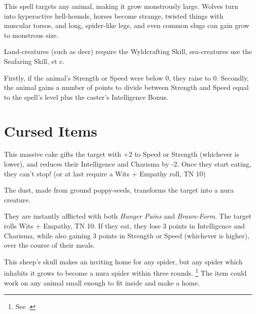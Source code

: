 \begin{multicols}{2}
This spell targets any animal, making it grow monstrously large.
Wolves turn into hyperactive hell-hounds, horses become strange, twisted things with muscular torsos, and long, spider-like legs, and even common slugs can gain grow to monstrous size.

Land-creatures (such as deer) require the Wyldcrafting Skill, sea-creatures use the Seafaring Skill, et c.

Firstly, if the animal's Strength or Speed were below 0, they raise to 0.
Secondly, the animal gains a number of points to divide between Strength and Speed equal to the spell's level plus the caster's Intelligence Bonus.

\end{multicols}

\section{Cursed Items}

\begin{multicols}{2}

\label{birthdayCake}

This massive cake gifts the target with +2 to Speed or Strength (whichever is lower), and reduces their Intelligence and Charisma by -2.
Once they start eating, they can't stop!
(or at last require a Wits + Empathy roll, TN 10)

\label{ogredust}

The dust, made from ground poppy-seeds, transforms the target into a nura creature.

They are instantly afflicted with both \textit{Hunger Pains} and \textit{Brawn-Form}.
The target rolls Wits + Empathy, TN 10.
If they eat, they lose 3 points in Intelligence and Charisma, while also gaining 3 points in Strength or Speed (whichever is higher), over the course of their meals.

\label{spiderskull}

This sheep's skull makes an inviting home for any spider, but any spider which inhabits it grows to become a nura spider within three rounds.
\footnote{See .}
The item could work on any animal small enough to fit inside and make a home.

\end{multicols}
